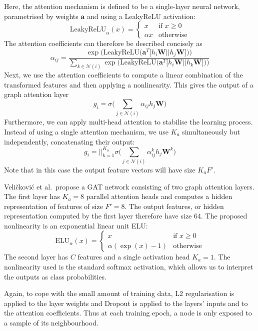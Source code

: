 \documentclass[12pt]{article}
\theoremstyle{definition}
\begin{document}
Here, the attention mechanism is defined to be a single-layer neural network, parametrised by weights $\textbf{a}$ and using a LeakyReLU activation: 
\[
\textrm{LeakyReLU}_{\alpha}(x) = 
	\begin{cases}
		x &\text{if $x \ge 0$}\\
		\alpha x &\text{otherwise}
	\end{cases}
\]
The attention coefficients can therefore be described concisely as
\[
\alpha_{ij} = \frac{\exp \big( \textrm{LeakyReLU}\big( \textbf{a}^T \big[ h_i \textbf{W} \vert\vert h_j \textbf{W} \big] \big) \big)}
{
\sum_{k \in \mathcal{N}(i)} \exp \big( \textrm{LeakyReLU}\big( \textbf{a}^T \big[ h_i \textbf{W} \vert\vert h_k \textbf{W} \big] \big) \big)
}
\]
Next, we use the attention coefficients to compute a linear combination of the transformed features and then applying a nonlinearity. This gives the output of a graph attention layer
\[
g_i = \sigma \big( \sum_{j \in \mathcal{N}(i)} \alpha_{ij} h_j \textbf{W} \big)
\]
Furthermore, we can apply multi-head attention to stabilise the learning process. Instead of using a single attention mechanism, we use $K_a$ simultaneously but independently, concatenating their output:
\[
g_i = {\Big\vert\Big\vert}_{k=1}^{K_a} \sigma \big( \sum_{j \in \mathcal{N}(i)} \alpha_{ij}^k h_j \textbf{W}^k \big)
\]
Note that in this case the output feature vectors will have size $K_a F'$.

\bigskip

Veli{\v{c}}kovi{\'{c}} et al.\ propose a GAT network consisting of two graph attention layers. The first layer has $K_a=8$ parallel attention heads and computes a hidden representation of features of size $F'=8$. The output features, or hidden representation computed by the first layer therefore have size $64$. The proposed nonlinearity is an exponential linear unit ELU:
\[
\textrm{ELU}_{\alpha}(x) = 
	\begin{cases}
		x &\text{if $x \ge 0$}\\
		\alpha (\exp(x) - 1) &\text{otherwise}
	\end{cases}
\]
The second layer has $C$ features and a single activation head $K_a=1$. The nonlinearity used is the standard softmax activation, which allows us to interpret the outputs as class probabilities.

Again, to cope with the small amount of training data, L2 regularisation is applied to the layer weights and Dropout \cite{srivastava2014dropout} is applied to the layers' inputs and to the attention coefficients. Thus at each training epoch, a node is only exposed to a sample of its neighbourhood. 
\end{document}
